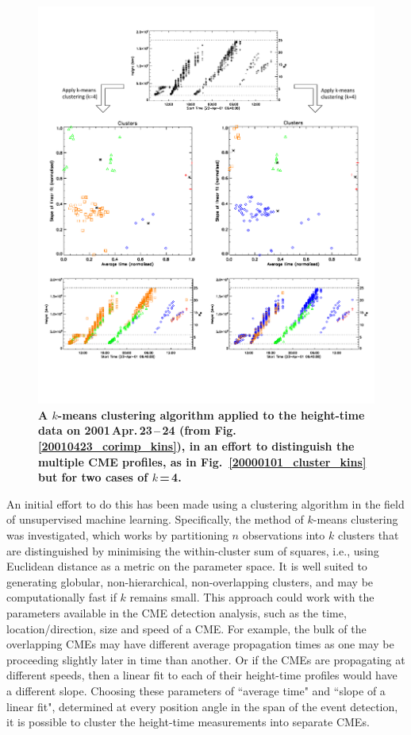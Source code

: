 \documentclass[referee,a4paper,12pt,traditabstract]{swsc}
\begin{document}
\begin{linenumbers}
\begin{figure}[ht]
\centerline{\includegraphics[scale=0.578, trim=0 95 0 50, clip=true]{images/20010423_cluster_kins_input.pdf}}
\caption{{\bf A $k$-means clustering algorithm applied to the height-time data on 2001\,Apr.\,23\,--\,24 (from Fig.\,\ref{20010423_corimp_kins}), in an effort to distinguish the multiple CME profiles, as in Fig.~\ref{20000101_cluster_kins} but for two cases of $k$\,=\,4.}
}
\label{20010423_cluster_kins}
\end{figure}


An initial effort to do this has been made using a clustering algorithm in the field of unsupervised machine learning. Specifically, the method of $k$-means clustering was investigated, which works by partitioning $n$ observations into $k$ clusters that are distinguished by minimising the within-cluster sum of squares, i.e., using Euclidean distance as a metric on the parameter space. It is well suited to generating globular, non-hierarchical, non-overlapping clusters, and may be computationally fast if $k$ remains small. This approach could work with the parameters available in the CME detection analysis, such as the time, location/direction, size and speed of a CME. For example, the bulk of the overlapping CMEs may have different average propagation times as one may be proceeding slightly later in time than another. Or if the CMEs are propagating at different speeds, then a linear fit to each of their height-time profiles would have a different slope. Choosing these parameters of ``average time" and ``slope of a linear fit", determined at every position angle in the span of the event detection, it is possible to cluster the height-time measurements into separate CMEs.


\end{linenumbers}
\end{document}
